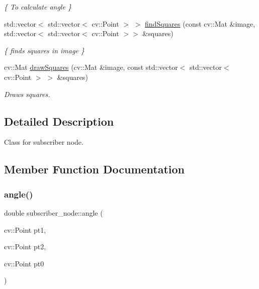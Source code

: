 \begin{DoxyCompactItemize}
\begin{DoxyCompactList}\small\item\em \{ To calculate angle \} \end{DoxyCompactList}\item 
std\+::vector$<$ std\+::vector$<$ cv\+::\+Point $>$ $>$ \hyperlink{classsubscriber__node_aa0685059ef9148803de8e8633f46765b}{find\+Squares} (const cv\+::\+Mat \&image, std\+::vector$<$ std\+::vector$<$ cv\+::\+Point $>$$>$ \&squares)
\begin{DoxyCompactList}\small\item\em \{ finds squares in image \} \end{DoxyCompactList}\item 
cv\+::\+Mat \hyperlink{classsubscriber__node_aa1a17de5fe19b124d6e62e691e508746}{draw\+Squares} (cv\+::\+Mat \&image, const std\+::vector$<$ std\+::vector$<$ cv\+::\+Point $>$ $>$ \&squares)
\begin{DoxyCompactList}\small\item\em Draws squares. \end{DoxyCompactList}\end{DoxyCompactItemize}


\subsection{Detailed Description}
Class for subscriber node. 

\subsection{Member Function Documentation}
\mbox{\label{classsubscriber__node_acdf1620562e8b05d155e3a58e41c28d6}} 
\subsubsection{\texorpdfstring{angle()}{angle()}}
{\footnotesize\ttfamily double subscriber\+\_\+node\+::angle (\begin{DoxyParamCaption}\item[{cv\+::\+Point}]{pt1,  }\item[{cv\+::\+Point}]{pt2,  }\item[{cv\+::\+Point}]{pt0 }\end{DoxyParamCaption})}



